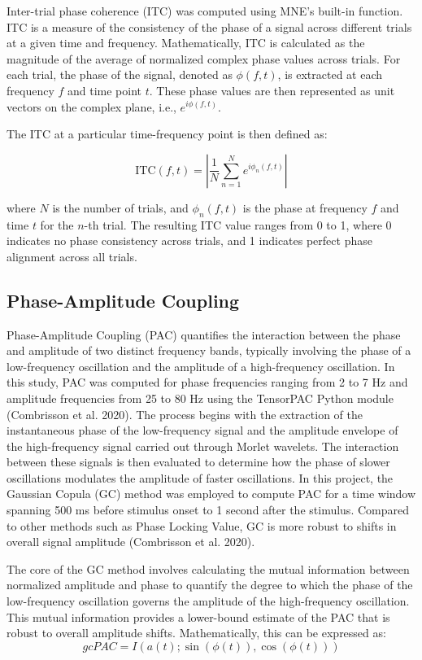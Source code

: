 \documentclass[
  letterpaper,
  DIV=11,
  numbers=noendperiod]{scrartcl}
\begin{document}
Inter-trial phase coherence (ITC) was computed using MNE's built-in
function. ITC is a measure of the consistency of the phase of a signal
across different trials at a given time and frequency. Mathematically,
ITC is calculated as the magnitude of the average of normalized complex
phase values across trials. For each trial, the phase of the signal,
denoted as \(\phi(f, t)\), is extracted at each frequency \(f\) and time
point \(t\). These phase values are then represented as unit vectors on
the complex plane, i.e., \(e^{i\phi(f, t)}\).

The ITC at a particular time-frequency point is then defined as:

\[
\text{ITC}(f, t) = \left| \frac{1}{N} \sum_{n=1}^{N} e^{i\phi_n(f, t)} \right|
\]

where \(N\) is the number of trials, and \(\phi_n(f, t)\) is the phase
at frequency \(f\) and time \(t\) for the \(n\)-th trial. The resulting
ITC value ranges from 0 to 1, where 0 indicates no phase consistency
across trials, and 1 indicates perfect phase alignment across all
trials.

\subsection{Phase-Amplitude Coupling}\label{phase-amplitude-coupling}

Phase-Amplitude Coupling (PAC) quantifies the interaction between the
phase and amplitude of two distinct frequency bands, typically involving
the phase of a low-frequency oscillation and the amplitude of a
high-frequency oscillation. In this study, PAC was computed for phase
frequencies ranging from 2 to 7 Hz and amplitude frequencies from 25 to
80 Hz using the TensorPAC Python module (Combrisson et al. 2020). The
process begins with the extraction of the instantaneous phase of the
low-frequency signal and the amplitude envelope of the high-frequency
signal carried out through Morlet wavelets. The interaction between
these signals is then evaluated to determine how the phase of slower
oscillations modulates the amplitude of faster oscillations. In this
project, the Gaussian Copula (GC) method was employed to compute PAC for
a time window spanning 500 ms before stimulus onset to 1 second after
the stimulus. Compared to other methods such as Phase Locking Value, GC
is more robust to shifts in overall signal amplitude (Combrisson et al.
2020).

The core of the GC method involves calculating the mutual information
between normalized amplitude and phase to quantify the degree to which
the phase of the low-frequency oscillation governs the amplitude of the
high-frequency oscillation. This mutual information provides a
lower-bound estimate of the PAC that is robust to overall amplitude
shifts. Mathematically, this can be expressed as: \[
gcPAC = I(a(t); \sin(\phi(t)), \cos(\phi(t)))
\]
\end{document}
